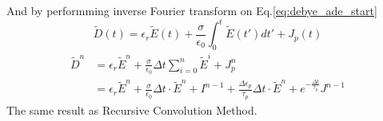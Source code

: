 And by performming inverse Fourier transform on Eq.\ref{eq:debye_ade_start}
\begin{equation}
  \widetilde{D}(t) = \epsilon_r\widetilde{E}(t) + \frac{\sigma}{\epsilon_0} \int_0^t\widetilde{E}(t')dt' + J_p(t)
\end{equation}
\begin{equation}
  \begin{split}
    \widetilde{D}^n & = \epsilon_r\widetilde{E}^n + \frac{\sigma}{\epsilon_0}\Delta t\sum_{i=0}^n\widetilde{E}^i + J_p^n\\
    & = \epsilon_r\widetilde{E}^n + \frac{\sigma}{\epsilon_0}\Delta t\cdot\widetilde{E}^n + I^{n-1} + \frac{\Delta\epsilon_p}{\tau_p}\Delta t\cdot\widetilde{E}^n + e^{-\frac{\Delta t}{\tau_p}}J^{n-1}
  \end{split}
\end{equation}
The same result as Recursive Convolution Method.






